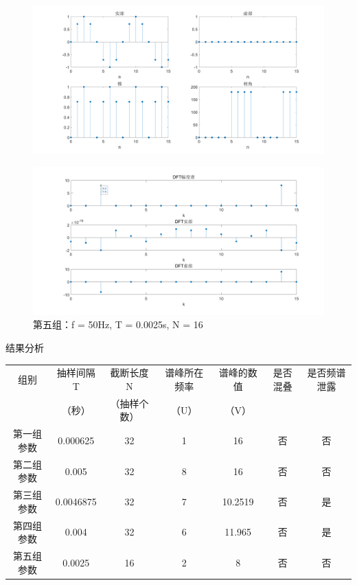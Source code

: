 \documentclass{../source/Experiment copy}
\begin{document}
                \begin{figure}[H]
                    \centering
                    \includegraphics[width = \textwidth]{src/exp2_5_2.png}
                \end{figure}

                \begin{figure}[H]
                    \centering
                    \includegraphics[width = \textwidth]{src/exp2_5_3.png}
                    \caption{第五组：f = 50Hz, T = 0.0025s, N = 16}
                \end{figure}
                结果分析
                \begin{table}[H]
                    \centering
                    \begin{tabular}{|c|c|c|c|c|c|c|}
                    \hline
                    组别    & 抽样间隔T     & 截断长度N  & 谱峰所在频率 & 谱峰的数值   & 是否混叠 & 是否频谱泄露 \\
                          & （秒）       & （抽样个数） & （U）    & （V）     &      &        \\ \hline
                    第一组参数 & 0.000625  & 32     & 1      & 16      & 否    & 否      \\ \hline
                    第二组参数 & 0.005     & 32     & 8      & 16      & 否    & 否      \\ \hline
                    第三组参数 & 0.0046875 & 32     & 7      & 10.2519 & 否    & 是      \\ \hline
                    第四组参数 & 0.004     & 32     & 6      & 11.965  & 否    & 是      \\ \hline
                    第五组参数 & 0.0025    & 16     & 2      & 8       & 否    & 否      \\ \hline
                    \end{tabular}
                \end{table}
\end{document}
